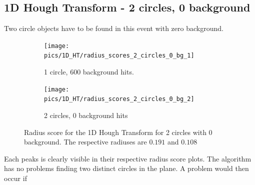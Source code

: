 \documentclass[11pt,twoside]{scrreprt}
\begin{document}
\subsection{1D Hough Transform - 2 circles, 0 background} %
\label{sub:1d_hough_transform_2_circles_0_background}
Two circle objects have to be found in this event with zero background.
\begin{figure}[htp]
        \centering
        \begin{subfigure}[t]{0.5\textwidth}
                \centering
                \texttt{[image: pics/1D\_HT/radius\_scores\_2\_circles\_0\_bg\_1]}
                \caption{1 circle, 600 background hits.}
                \label{fig:2c0bg_radius1}
        \end{subfigure}%
        \begin{subfigure}[t]{0.5\textwidth}
                \centering
                \texttt{[image: pics/1D\_HT/radius\_scores\_2\_circles\_0\_bg\_2]}
                \caption{2 circles, 0 background hits}
                \label{fig:2c0b_radius2}
        \end{subfigure}
        \caption{Radius score for the 1D Hough Transform for 2 circles with 0 background. The respective radiuses are $0.191$ and $0.108$ }\label{fig:1d_ht_radius}
\end{figure}
Each peaks is clearly visible in their respective radius score plots. The algorithm has no problems finding two distinct circles in the plane. A problem
would then occur if
\clearpage
\end{document}
